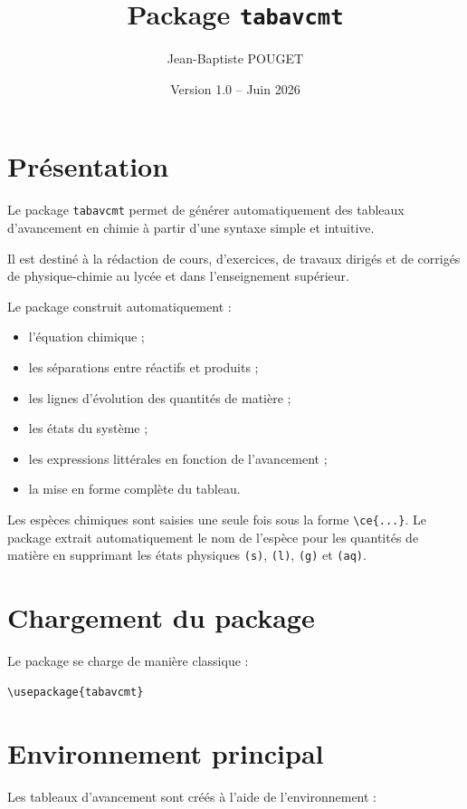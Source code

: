 \documentclass[a4paper,11pt]{article}
\title{Package \texttt{tabavcmt}}
\author{Jean-Baptiste POUGET}
\date{Version 1.0 -- Juin 2026}
\begin{document}
\maketitle

\section{Présentation}

Le package \texttt{tabavcmt} permet de générer automatiquement des tableaux d'avancement en chimie à partir d'une syntaxe simple et intuitive.

Il est destiné à la rédaction de cours, d'exercices, de travaux dirigés et de corrigés de physique-chimie au lycée et dans l'enseignement supérieur.

Le package construit automatiquement :

\begin{itemize}
\item l'équation chimique ;
\item les séparations entre réactifs et produits ;
\item les lignes d'évolution des quantités de matière ;
\item les états du système ;
\item les expressions littérales en fonction de l'avancement ;
\item la mise en forme complète du tableau.
\end{itemize}

Les espèces chimiques sont saisies une seule fois sous la forme \verb|\ce{...}|. Le package extrait automatiquement le nom de l'espèce pour les quantités de matière en supprimant les états physiques \verb|(s)|, \verb|(l)|, \verb|(g)| et \verb|(aq)|.

\section{Chargement du package}

Le package se charge de manière classique : \begin{verbatim}
\usepackage{tabavcmt}
\end{verbatim}

\section{Environnement principal}

Les tableaux d'avancement sont créés à l'aide de l'environnement :
\end{document}

